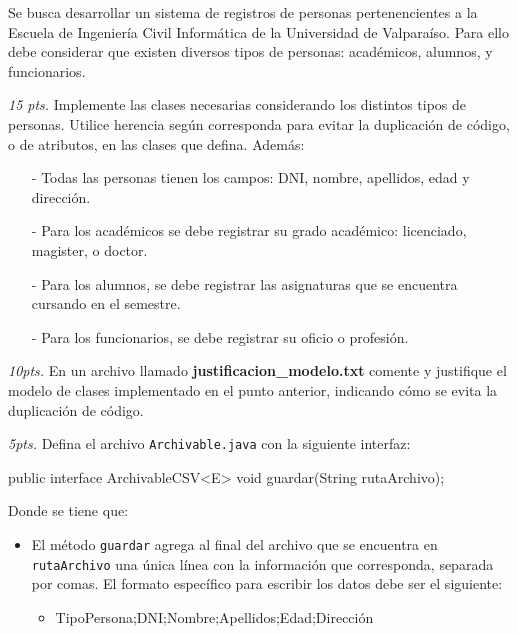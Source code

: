 \documentclass{exam}
\begin{document}
Se busca desarrollar un sistema de registros de personas
pertenencientes a la Escuela de Ingeniería Civil Informática de la
Universidad de Valparaíso. Para ello debe considerar que existen
diversos tipos de personas: académicos, alumnos, y funcionarios. 

\begin{questions}


\item \emph{15 pts.} Implemente las clases necesarias considerando los
  distintos tipos de personas. Utilice herencia según corresponda para
  evitar la duplicación de código, o de atributos, en las clases que
  defina. Además:
  
  \begin{enumerate}
  \item[-] Todas las personas tienen los campos: DNI, nombre,
    apellidos, edad y dirección.
  \item[-] Para los académicos se debe registrar su grado académico:
    licenciado, magister, o doctor.
  \item[-] Para los alumnos, se debe registrar las asignaturas que se
    encuentra cursando en el semestre.
  \item[-] Para los funcionarios, se debe registrar su oficio o profesión.
  \end{enumerate}

\item \emph{10pts.}  En un archivo llamado
  \textbf{justificacion\_modelo.txt} comente y justifique el modelo de
  clases implementado en el punto anterior, indicando cómo se evita la
  duplicación de código.

\item \emph{5pts.} Defina el archivo {\tt Archivable.java} con la
  siguiente interfaz:

  \begin{jsmall}
    public interface ArchivableCSV<E> { void guardar(String rutaArchivo); }
  \end{jsmall}

  \noindent Donde se tiene que:

  \begin{itemize}
  \item El método {\tt guardar} agrega al final del archivo que se
    encuentra en {\tt rutaArchivo} una única línea con la información
    que corresponda, separada por comas. El formato específico para
    escribir los datos debe ser el siguiente:

    \begin{itemize}
    \item TipoPersona;DNI;Nombre;Apellidos;Edad;Dirección
    \end{itemize}


\end{itemize}
\end{questions}
\end{document}
